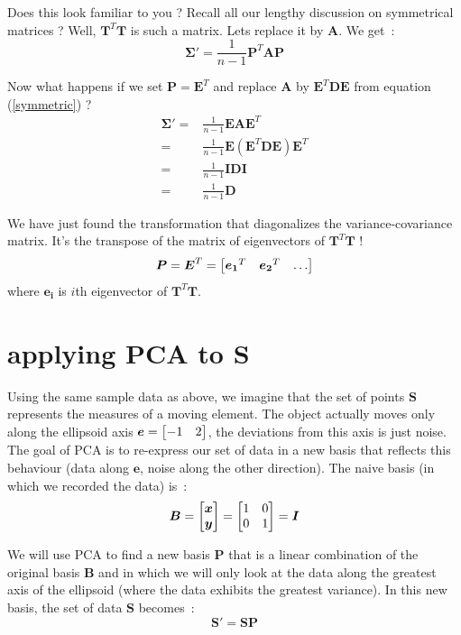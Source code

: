 \documentclass[11pt,twocolumn]{amsart} %
\newcommand{\ve}[1]{\boldsymbol{#1}}
\newcommand{\ma}[1]{\boldsymbol{#1}}
\newenvironment{m}{\begin{bmatrix}}{\end{bmatrix}}
\begin{document}
Does this look familiar to you ? Recall all our lengthy discussion on symmetrical matrices ? Well, $\ma{T}^T\ma{T}$ is such a matrix. Lets replace it by $\ma{A}$. We get~:
\[
  \ma\Sigma'     = \frac{1}{n-1} \ma{P}^T\ma{A}\ma{P}
\]

Now what happens if we set $\ma{P} = \ma{E}^T$ and replace $\ma{A}$ by $\ma{E}^T\ma{D}\ma{E}$ from equation (\ref{symmetric}) ?
\begin{align*}
  \ma\Sigma' = & \frac{1}{n-1}\ma{E}\ma{A}\ma{E}^T \\
             = & \frac{1}{n-1}\ma{E}(\ma{E}^T\ma{D}\ma{E})\ma{E}^T \\
             = & \frac{1}{n-1}\ma{I}\ma{D}\ma{I} \\
             = & \frac{1}{n-1}\ma{D}
\end{align*}

We have just found the transformation that diagonalizes the variance-covariance matrix. It's the transpose of the matrix of eigenvectors of $\ma{T}^T\ma{T}$ !
\[
  \ma{P} = \ma{E}^T = \begin{m} \ve{e_1}^T & \ve{e_2}^T & \hdots \end{m}
\]
where $\ve{e_i}$ is $i$th eigenvector of $\ma{T}^T\ma{T}$.

\section{applying PCA to $\ma{S}$}

Using the same sample data as above, we imagine that the set of points $\textbf{S}$ represents the measures of a moving element. The object actually moves only along the ellipsoid axis $\ve{e} = \begin{m}-1 & 2 \end{m}$, the deviations from this axis is just noise. The goal of PCA is to re-express our set of data in a new basis that reflects this behaviour (data along $\ve{e}$, noise along the other direction). The naive basis (in which we recorded the data) is~:
\[
  \ma{B} = \begin{m} \ve{x} \\ \ve{y} \end{m} = \begin{m} 1 & 0 \\ 0 & 1 \end{m} = \ma{I}
\]

We will use PCA to find a new basis $\ma{P}$ that is a linear combination of the original basis $\ma{B}$ and in which we will only look at the data along the greatest axis of the ellipsoid (where the data exhibits the greatest variance). In this new basis, the set of data $\ma{S}$ becomes~:
\[
  \ma{S'} = \ma{S}\ma{P}
\]
\end{document}
